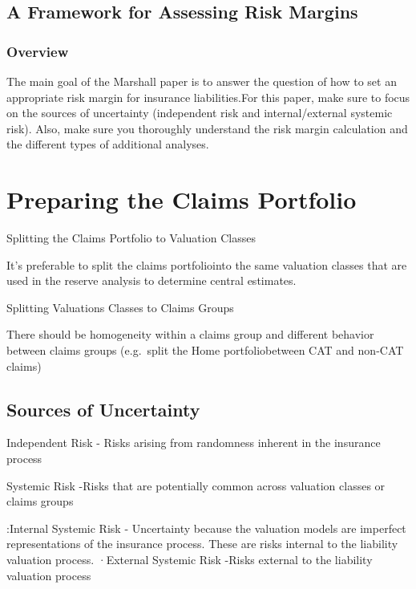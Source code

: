 \documentclass[
]{article}
\begin{document}
\subsection{A Framework for Assessing Risk
Margins}\label{a-framework-for-assessing-risk-margins}

\subsubsection{Overview}\label{overview-12}

The main goal of the Marshall paper is to answer the question of how to
set an appropriate risk margin for insurance liabilities.For this paper,
make sure to focus on the sources of uncertainty (independent risk and
internal/external systemic risk). Also, make sure you thoroughly
understand the risk margin calculation and the different types of
additional analyses.

\section{Preparing the Claims
Portfolio}\label{preparing-the-claims-portfolio}

Splitting the Claims Portfolio to Valuation Classes

It's preferable to split the claims portfoliointo the same valuation
classes that are used in the reserve analysis to determine central
estimates.

Splitting Valuations Classes to Claims Groups

There should be homogeneity within a claims group and different behavior
between claims groups (e.g.~split the Home portfoliobetween CAT and
non-CAT claims)

\subsection{Sources of Uncertainty}\label{sources-of-uncertainty}

Independent Risk - Risks arising from randomness inherent in the
insurance process

Systemic Risk -Risks that are potentially common across valuation
classes or claims groups

:Internal Systemic Risk - Uncertainty because the valuation models are
imperfect representations of the insurance process. These are risks
internal to the liability valuation process. ·External Systemic Risk
-Risks external to the liability valuation process
\end{document}
